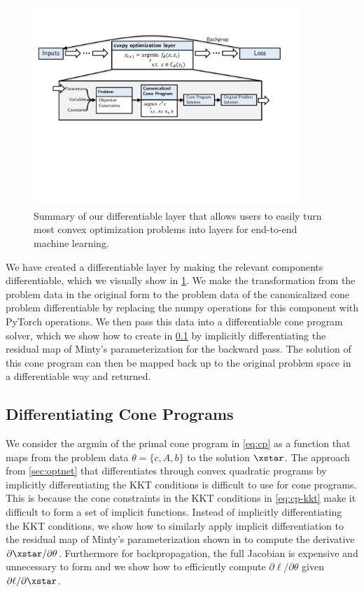 \begin{figure}[t]
  \centering
  \includegraphics[width=0.9\textwidth]{overview.pdf}
  \caption{
    Summary of our differentiable \cvxpy layer that allows
    users to easily turn most convex optimization problems into
    layers for end-to-end machine learning.
  }
  \label{fig:overview}
\end{figure}

We have created a differentiable \cvxpy layer
by making the relevant components differentiable,
which we visually show in \cref{fig:overview}.
We make the transformation from the problem data in the original
form to the problem data of the canonicalized cone problem
differentiable by replacing the numpy operations for this component
with PyTorch \citep{paszke2017automatic} operations.
We then pass this data into a differentiable cone program
solver, which we show how to create in \cref{sec:diff-cp}
by implicitly differentiating the residual map of
Minty's parameterization for the backward pass.
The solution of this cone program can then be mapped
back up to the original problem space in a differentiable
way and returned.

\subsection{Differentiating Cone Programs}
\label{sec:diff-cp}
We consider the argmin of the primal cone program
in \cref{eq:cp} as a function that maps from the
problem data $\theta = \{c, A, b\}$ to the solution $\xstar$.
The approach from \cref{sec:optnet}
that differentiates through convex quadratic programs by
implicitly differentiating the KKT conditions
is difficult to use for cone programs.
This is because the cone constraints in the KKT conditions
in \cref{eq:cp-kkt} make it difficult to form a
set of implicit functions.
Instead of implicitly differentiating the KKT conditions,
we show how to similarly apply implicit
differentiation to the residual map of
Minty's parameterization shown in \citet{busseti2018solution}
to compute the derivative
$\partial \xstar/\partial \theta$.
Furthermore for backpropagation, the full Jacobian is
expensive and unnecessary to form and we show how to
efficiently compute $\partial \ell/\partial \theta$
given $\partial \ell/\partial \xstar$.

